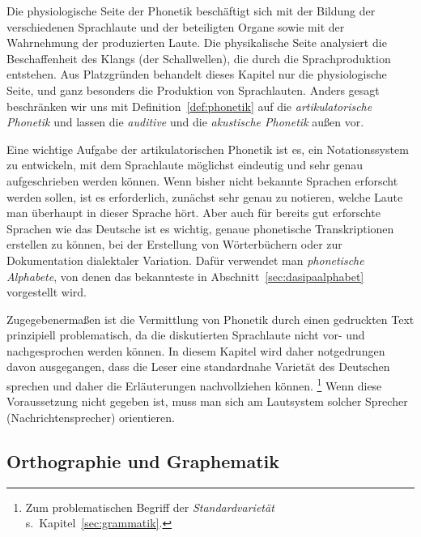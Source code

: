 Die physiologische Seite der Phonetik beschäftigt sich mit der Bildung der verschiedenen Sprachlaute und der beteiligten Organe sowie mit der Wahrnehmung der produzierten Laute.
Die physikalische Seite analysiert die Beschaffenheit des Klangs (der Schallwellen), die durch die Sprachproduktion entstehen.
Aus Platzgründen behandelt dieses Kapitel nur die physiologische Seite, und ganz besonders die Produktion von Sprachlauten.
Anders gesagt beschränken wir uns mit Definition~\ref{def:phonetik} auf die \textit{artikulatorische Phonetik} und lassen die \textit{auditive} und die \textit{akustische Phonetik} außen vor.


Eine wichtige Aufgabe der artikulatorischen Phonetik ist es, ein Notationssystem zu entwickeln, mit dem Sprachlaute möglichst eindeutig und sehr genau aufgeschrieben werden können.
Wenn bisher nicht bekannte Sprachen erforscht werden sollen, ist es \zB erforderlich, zunächst sehr genau zu notieren, welche Laute man überhaupt in dieser Sprache hört.
Aber auch für bereits gut erforschte Sprachen wie das Deutsche ist es wichtig, genaue phonetische Transkriptionen erstellen zu können, \zB bei der Erstellung von Wörterbüchern oder zur Dokumentation dialektaler Variation.
Dafür verwendet man \textit{phonetische Alphabete}, von denen das bekannteste in Abschnitt~\ref{sec:dasipaalphabet} vorgestellt wird.

Zugegebenermaßen ist die Vermittlung von Phonetik durch einen gedruckten Text prinzipiell problematisch, da die diskutierten Sprachlaute nicht vor- und nachgesprochen werden können.
In diesem Kapitel wird daher notgedrungen davon ausgegangen, dass die Leser eine standardnahe Varietät des Deutschen sprechen und daher die Erläuterungen nachvollziehen können.%
\footnote{Zum problematischen Begriff der \textit{Standardvarietät} s.\ Kapitel~\ref{sec:grammatik}.}
Wenn diese Voraussetzung nicht gegeben ist, muss man sich am Lautsystem solcher Sprecher (\zB Nachrichtensprecher) orientieren.

\subsection{Orthographie und Graphematik}
\label{sec:orthographieundgraphematik}

